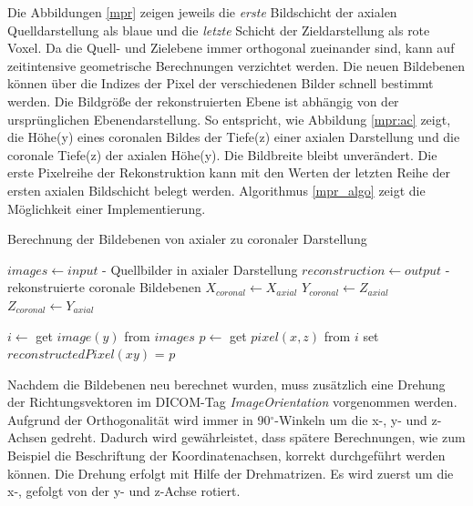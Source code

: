 Die Abbildungen \ref{mpr} zeigen jeweils die \textit{erste} Bildschicht der axialen Quelldarstellung als blaue und die \textit{letzte} Schicht der Zieldarstellung als rote Voxel. Da die Quell- und Zielebene immer orthogonal zueinander sind, kann auf zeitintensive geometrische  Berechnungen verzichtet werden. Die neuen Bildebenen können über die Indizes der Pixel der verschiedenen Bilder schnell bestimmt werden. Die Bildgröße der rekonstruierten Ebene ist abhängig von der ursprünglichen Ebenendarstellung. So entspricht, wie Abbildung \ref{mpr:ac} zeigt, die Höhe(y) eines coronalen Bildes der Tiefe(z) einer axialen Darstellung und die coronale Tiefe(z) der axialen Höhe(y). Die Bildbreite bleibt unverändert. Die erste Pixelreihe der Rekonstruktion kann mit den Werten der letzten Reihe der ersten axialen Bildschicht belegt werden. Algorithmus \ref{mpr_algo} zeigt die Möglichkeit einer Implementierung.

\begin{algorithm}
\caption{Berechnung der Bildebenen von axialer zu coronaler Darstellung}
\begin{algorithmic}[1] 
\STATE $images \leftarrow input$ - Quellbilder in axialer Darstellung
\STATE $reconstruction \leftarrow output$ - rekonstruierte coronale Bildebenen
\STATE $X_{coronal} \leftarrow X_{axial}$
\STATE $Y_{coronal} \leftarrow Z_{axial}$
\STATE $Z_{coronal} \leftarrow Y_{axial}$

        	\STATE $i \leftarrow$  get $image(y)$ from $images$ 
        	\STATE $p \leftarrow$ get $pixel(x, z)$ from $i$ 
            \STATE set $reconstructedPixel(xy)$ = $p$
        \ENDFOR
    \ENDFOR
\ENDFOR

\end{algorithmic}
\label{mpr_algo}
\end{algorithm}

Nachdem die Bildebenen neu berechnet wurden, muss zusätzlich eine Drehung der Richtungsvektoren im DICOM-Tag \textit{ImageOrientation} vorgenommen werden. Aufgrund der Orthogonalität wird immer in 90$^\circ$-Winkeln um die x-, y- und z-Achsen gedreht. Dadurch wird gewährleistet, dass spätere Berechnungen, wie zum Beispiel die Beschriftung der Koordinatenachsen, korrekt durchgeführt werden können.
Die Drehung erfolgt mit Hilfe der Drehmatrizen. Es wird zuerst um die x-, gefolgt von der y- und z-Achse rotiert.

